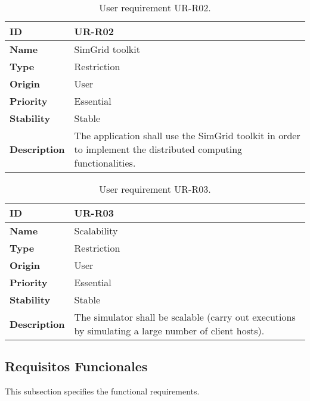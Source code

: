 \begin{center}
\begin{table*}[htbp]
\centering
\begin{tabular}{@{}p{2.5cm} p{9cm}@{}} 
\toprule
\textbf{ID} 				& UR-R02\\
\midrule
\textbf{Name} 			& SimGrid toolkit \\
\midrule
\textbf{Type} 			& Restriction \\
\midrule
\textbf{Origin} 			& User \\
\midrule
\textbf{Priority}		& Essential \\
\midrule
\textbf{Stability} 		& Stable \\
\midrule
\textbf{Description} 	& The application shall use the SimGrid toolkit in order to implement the distributed computing functionalities. \\
\bottomrule
\end{tabular}
\caption{User requirement UR-R02.}
\label{tab:urr02}
\end{table*}
\end{center}

\begin{center}
\begin{table*}[htbp]
\centering
\begin{tabular}{@{}p{2.5cm} p{9cm}@{}} 
\toprule
\textbf{ID} 				& UR-R03\\
\midrule
\textbf{Name} 			& Scalability \\
\midrule
\textbf{Type} 			& Restriction \\
\midrule
\textbf{Origin} 			& User \\
\midrule
\textbf{Priority}		& Essential \\
\midrule
\textbf{Stability} 		& Stable \\
\midrule
\textbf{Description} 	& The simulator shall be scalable (carry out executions by simulating a large number of client hosts). \\
\bottomrule
\end{tabular}
\caption{User requirement UR-R03.}
\label{tab:urr03}
\end{table*}
\end{center}

\clearpage
\subsection{Requisitos Funcionales}

This subsection specifies the functional requirements.

